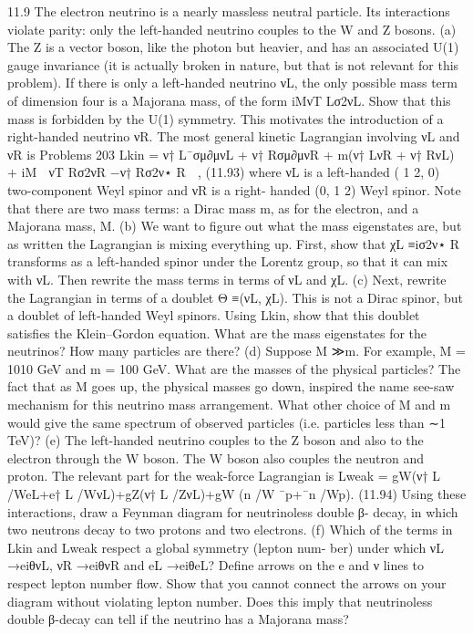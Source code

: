 11.9 The electron neutrino is a nearly massless neutral particle. Its interactions violate
parity: only the left-handed neutrino couples to the W and Z bosons.
(a) The Z is a vector boson, like the photon but heavier, and has an associated U(1)
gauge invariance (it is actually broken in nature, but that is not relevant for this
problem). If there is only a left-handed neutrino νL, the only possible mass
term of dimension four is a Majorana mass, of the form iMνT
Lσ2νL. Show that
this mass is forbidden by the U(1) symmetry.
This motivates the introduction of a right-handed neutrino νR. The most
general kinetic Lagrangian involving νL and νR is
Problems
203
Lkin = ν†
L¯σμ∂μνL + ν†
Rσμ∂μνR + m(ν†
LνR + ν†
RνL)
+ iM

νT
Rσ2νR −ν†
Rσ2ν⋆
R

,
(11.93)
where νL is a left-handed ( 1
2, 0) two-component Weyl spinor and νR is a right-
handed (0, 1
2) Weyl spinor. Note that there are two mass terms: a Dirac mass
m, as for the electron, and a Majorana mass, M.
(b) We want to ﬁgure out what the mass eigenstates are, but as written the
Lagrangian is mixing everything up. First, show that χL ≡iσ2ν⋆
R transforms
as a left-handed spinor under the Lorentz group, so that it can mix with νL.
Then rewrite the mass terms in terms of νL and χL.
(c) Next, rewrite the Lagrangian in terms of a doublet ⃗Θ ≡(νL, χL). This is not a
Dirac spinor, but a doublet of left-handed Weyl spinors. Using Lkin, show that
this doublet satisﬁes the Klein–Gordon equation. What are the mass eigenstates
for the neutrinos? How many particles are there?
(d) Suppose M ≫m. For example, M = 1010 GeV and m = 100 GeV. What are
the masses of the physical particles? The fact that as M goes up, the physical
masses go down, inspired the name see-saw mechanism for this neutrino mass
arrangement. What other choice of M and m would give the same spectrum of
observed particles (i.e. particles less than ∼1 TeV)?
(e) The left-handed neutrino couples to the Z boson and also to the electron
through the W boson. The W boson also couples the neutron and proton. The
relevant part for the weak-force Lagrangian is
Lweak = gW(ν†
L /WeL+e†
L /WνL)+gZ(ν†
L /ZνL)+gW (n /W ¯p+¯n /Wp). (11.94)
Using these interactions, draw a Feynman diagram for neutrinoless double β-
decay, in which two neutrons decay to two protons and two electrons.
(f) Which of the terms in Lkin and Lweak respect a global symmetry (lepton num-
ber) under which νL →eiθνL, νR →eiθνR and eL →eiθeL? Deﬁne
arrows on the e and ν lines to respect lepton number ﬂow. Show that you
cannot connect the arrows on your diagram without violating lepton number.
Does this imply that neutrinoless double β-decay can tell if the neutrino has a
Majorana mass?

